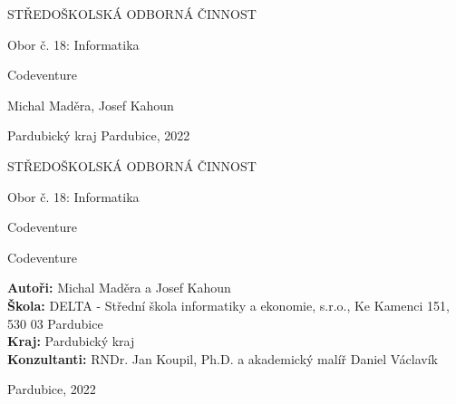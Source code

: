 \begin{titlepage}
    \bfseries{
        \begin{center}
            \LARGE{STŘEDOŠKOLSKÁ ODBORNÁ ČINNOST}

            \vspace{14pt}
            \large{
                Obor č. 18: Informatika
            }

            \vspace{0.35 \textheight}

            \LARGE{
			Codeventure
            }

            \vspace{0.35\textheight}
        \end{center}
        
        \noindent\Large{Michal Maděra, Josef Kahoun}

        \noindent\Large{Pardubický kraj   Pardubice, 2022}
        
            
    }
\end{titlepage}

\cleardoublepage

{\bfseries
    \begin{center}
        \LARGE{STŘEDOŠKOLSKÁ ODBORNÁ ČINNOST}

        \vspace{14pt}
        {\large
            Obor č. 18: Informatika
        }

        \vspace{0.3 \textheight}

        \LARGE{
        Codeventure
        }

        \LARGE{
        Codeventure
        }

        \vspace{0.24\textheight}
    \end{center}  
}
{\Large
    \noindent\textbf{Autoři:} Michal Maděra a Josef Kahoun\\
    \textbf{Škola:} DELTA - Střední škola informatiky a ekonomie, s.r.o., Ke Kamenci 151, 530 03 Pardubice\\
    \textbf{Kraj:} Pardubický kraj\\
    \textbf{Konzultanti:} RNDr. Jan Koupil, Ph.D. a akademický malíř Daniel Václavík\\
}

\noindent Pardubice, 2022

\cleardoublepage

